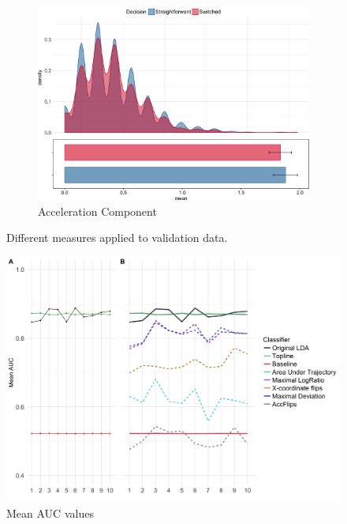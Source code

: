 \documentclass{article}
\begin{document}
\begin{figure}
\begin{subfigure}[b]{0.4\textwidth}
\includegraphics[width=\textwidth]{AC_calibration.png}
\caption{Acceleration Component}
\end{subfigure}

\caption{Different measures applied to validation data.}
\label{fig:different.measures.validation}

\end{figure}


\begin{figure}
\centering
\includegraphics[width=\textwidth]{auc_calibration_2.png}
\caption{Mean AUC values}  \label{DIST:AUC2}
\end{figure}
\end{document}
